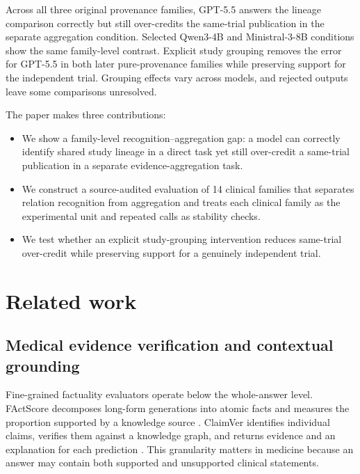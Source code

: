 \documentclass[11pt]{article}
\begin{document}
Across all three original provenance families, GPT-5.5 answers the lineage comparison correctly but still over-credits the same-trial publication in the separate aggregation condition. Selected Qwen3-4B and Ministral-3-8B conditions show the same family-level contrast. Explicit study grouping removes the error for GPT-5.5 in both later pure-provenance families while preserving support for the independent trial. Grouping effects vary across models, and rejected outputs leave some comparisons unresolved.

The paper makes three contributions:
\begin{itemize}
    \item We show a family-level recognition--aggregation gap: a model can correctly identify shared study lineage in a direct task yet still over-credit a same-trial publication in a separate evidence-aggregation task.

    \item We construct a source-audited evaluation of 14 clinical families that separates relation recognition from aggregation and treats each clinical family as the experimental unit and repeated calls as stability checks.

    \item We test whether an explicit study-grouping intervention reduces same-trial over-credit while preserving support for a genuinely independent trial.
\end{itemize}


\section{Related work}

\subsection{Medical evidence verification and contextual grounding}

Fine-grained factuality evaluators operate below the whole-answer level. FActScore decomposes long-form generations into atomic facts and measures the proportion supported by a knowledge source \citep{min-etal-2023-factscore}. ClaimVer identifies individual claims, verifies them against a knowledge graph, and returns evidence and an explanation for each prediction \citep{dammu-etal-2024-claimver}. This granularity matters in medicine because an answer may contain both supported and unsupported clinical statements.
\end{document}
